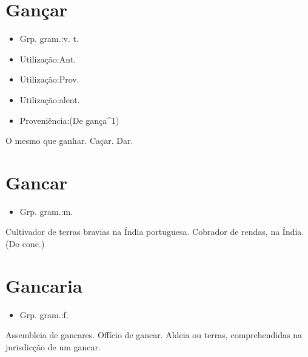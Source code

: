\section{Gançar}
\begin{itemize}
\item {Grp. gram.:v. t.}
\end{itemize}
\begin{itemize}
\item {Utilização:Ant.}
\end{itemize}
\begin{itemize}
\item {Utilização:Prov.}
\end{itemize}
\begin{itemize}
\item {Utilização:alent.}
\end{itemize}
\begin{itemize}
\item {Proveniência:(De \textunderscore gança\textunderscore ^1)}
\end{itemize}
O mesmo que \textunderscore ganhar\textunderscore .
Caçar.
Dar.
\section{Gancar}
\begin{itemize}
\item {Grp. gram.:m.}
\end{itemize}
Cultivador de terras bravias na Índia portuguesa.
Cobrador de rendas, na Índia.
(Do conc.)
\section{Gancaria}
\begin{itemize}
\item {Grp. gram.:f.}
\end{itemize}
Assembleia de gancares.
Offício de gancar.
Aldeia ou terras, comprehendidas na jurisdicção de um gancar.
